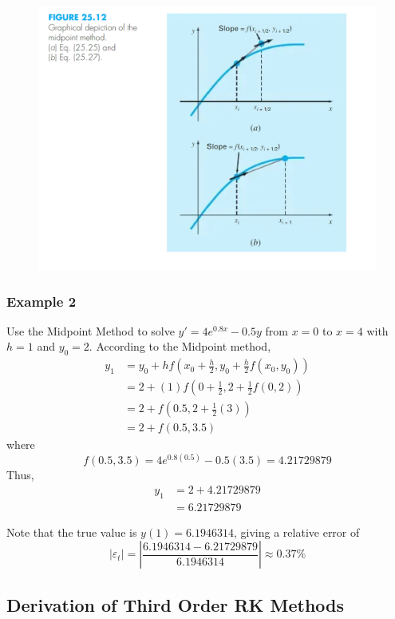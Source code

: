 \documentclass [titlepage,12pt,letter] {article}
\begin{document}
\begin{figure}[h] 
  \centering
  \includegraphics[scale=0.8]{figure25-12}
  \label{fig:Midpoint}
\end{figure}

\subsubsection{Example 2}Use the Midpoint Method to solve $y'=4e^{0.8x}-0.5y$ from $x=0$ to $x=4$ with $h=1$ and $y_0=2$. According to the Midpoint method,
\begin{align*}
y_1&=y_0+hf\left(x_0+\frac{h}{2},y_0+\frac{h}{2}f(x_0,y_0)\right) \\
&=2+(1)f\left(0+\frac{1}{2},2+\frac{1}{2}f(0,2)\right) \\
&=2+f\left(0.5,2+\frac{1}{2}(3)\right) \\
&=2+f\left(0.5,3.5\right)
\end{align*}
where
\[
f(0.5,3.5)=4e^{0.8(0.5)}-0.5(3.5)=4.21729879
\]
Thus,
\begin{align*}
y_1&=2+4.21729879 \\
&=6.21729879
\end{align*}

Note that the true value is $y(1)=6.1946314$, giving a relative error of
\[
|\varepsilon_t|=\left|\frac{6.1946314-6.21729879}{6.1946314}\right|\approx 0.37\%
\]

\subsection{Derivation of Third Order RK Methods}  
\end{document}
